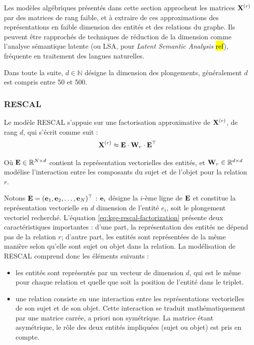Les modèles algébriques présentés dans cette section approchent les matrices $\bf{X}^{(r)}$ par des matrices de rang faible, et à extraire de ces approximations des représentations en faible dimension des entités et des relations du graphe. Ils peuvent être rapprochés de techniques de réduction de la dimension comme l'analyse sémantique latente (ou LSA, pour \textit{Latent Semantic Analysis} \hl{ref}), fréquente en traitement des langues naturelles.

Dans toute la suite, $d \in \mathbb{N}$ désigne la dimension des plongements, généralement $d$ est compris entre 50 et 500.

\subsubsection{RESCAL}

Le modèle RESCAL \cite{nickel2011learning} s'appuie sur une factorisation approximative de $\bf{X}^{(r)}$, de rang $d$, qui s'écrit comme suit  :
\begin{equation}
    \bf{X}^{(r)} \approx \bf{E} \cdot \bf{W}_r \cdot \bf{E}^\top
    \label{eq:kge-rescal-factorization}
\end{equation}

Où $\bf{E} \in \R^{N \times d}$ contient la représentation vectorielles des entités, et $\bf{W}_r \in \R^{d \times d}$ modélise l'interaction entre les composants du sujet et de l'objet pour la relation $r$.

Notons $\bf{E} = (\bf{e}_1, \bf{e}_2, \ldots, \bf{e}_N)^\top$ : $\bf{e}_i$ désigne la $i$-ème ligne de $\bf{E}$ et constitue la représentation vectorielle en $d$ dimension de l'entité $e_i$, soit le plongement vectoriel recherché. L'équation \ref{eq:kge-rescal-factorization} présente deux caractéristiques importantes : d'une part, la représentation des entités ne dépend pas de la relation $r$; d'autre part, les entités sont représentées de la même manière selon qu'elle sont sujet ou objet dans la relation. La modélisation de RESCAL comprend donc les éléments suivants :
\begin{itemize}
    \item les entités sont représentés par un vecteur de dimension $d$, qui est le même pour chaque relation et quelle que soit la position de l'entité dans le triplet. 
    \item une relation consiste en une interaction entre les représentations vectorielles de son sujet et de son objet. Cette interaction se traduit mathématiquement par une matrice carrée, a priori non symétrique. La matrice étant asymétrique, le rôle des deux entités impliquées (sujet ou objet) est pris en compte.
\end{itemize}

